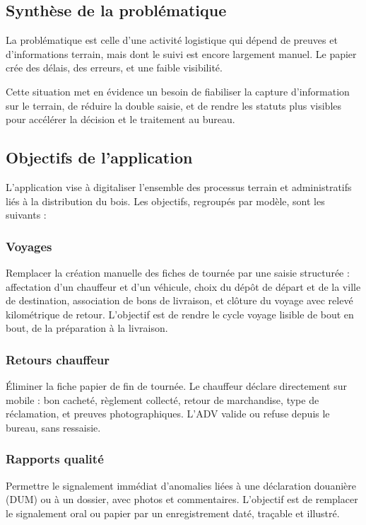 \documentclass[12pt,a4paper]{article}
\begin{document}
    \subsection{Synthèse de la problématique}
    La problématique est celle d'une activité logistique qui dépend de preuves et d'informations terrain, mais dont le suivi est encore largement manuel. Le papier crée des délais, des erreurs, et une faible visibilité.

    Cette situation met en évidence un besoin de fiabiliser la capture d'information sur le terrain, de réduire la double saisie, et de rendre les statuts plus visibles pour accélérer la décision et le traitement au bureau.

    \subsection{Objectifs de l'application}

    L'application vise à digitaliser l'ensemble des processus terrain et administratifs liés à la distribution du bois. Les objectifs, regroupés par modèle, sont les suivants :

    \subsubsection{Voyages}
    Remplacer la création manuelle des fiches de tournée par une saisie structurée : affectation d'un chauffeur et d'un véhicule, choix du dépôt de départ et de la ville de destination, association de bons de livraison, et clôture du voyage avec relevé kilométrique de retour. L'objectif est de rendre le cycle voyage lisible de bout en bout, de la préparation à la livraison.

    \subsubsection{Retours chauffeur}
    Éliminer la fiche papier de fin de tournée. Le chauffeur déclare directement sur mobile : bon cacheté, règlement collecté, retour de marchandise, type de réclamation, et preuves photographiques. L'ADV valide ou refuse depuis le bureau, sans ressaisie.

    \subsubsection{Rapports qualité}
    Permettre le signalement immédiat d'anomalies liées à une déclaration douanière (DUM) ou à un dossier, avec photos et commentaires. L'objectif est de remplacer le signalement oral ou papier par un enregistrement daté, traçable et illustré.
\end{document}
